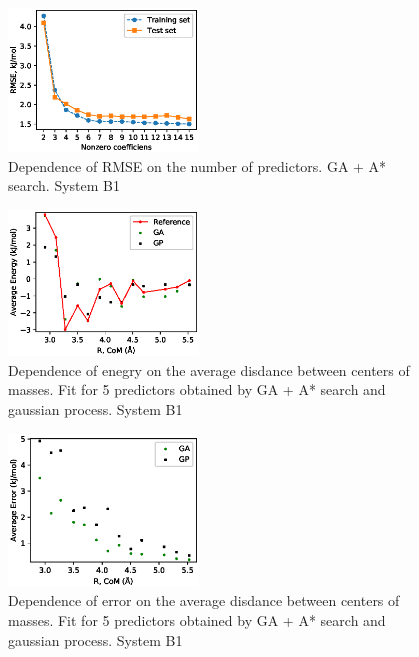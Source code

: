 \documentclass[aps,prl,reprint,amsmath,amssymb,nature]{revtex4-1}
\begin{document}
\begin{figure}
\includegraphics[width=0.45\textwidth]{media/B1_Single_GA_PATH_RMSE.eps}
\caption{Dependence of RMSE on the number of predictors. GA + A* search. System B1}\label{Fig:B1_RMSE}
\end{figure}

\begin{figure}
\includegraphics[width=0.45\textwidth]{media/B1_Single_Energy_5_predictors.eps}
\caption{Dependence of enegry on the average disdance between centers of masses. Fit for 5 predictors obtained by GA + A* search and gaussian process. System B1}\label{Fig:B1_Energy}
\end{figure}

\begin{figure}
\includegraphics[width=0.45\textwidth]{media/B1_Single_Error_5_predictors.eps}
\caption{Dependence of error on the average disdance between centers of masses. Fit for 5 predictors obtained by GA + A* search and gaussian process. System B1}\label{Fig:B1_RMSE_5_predictors}
\end{figure}
\end{document}
